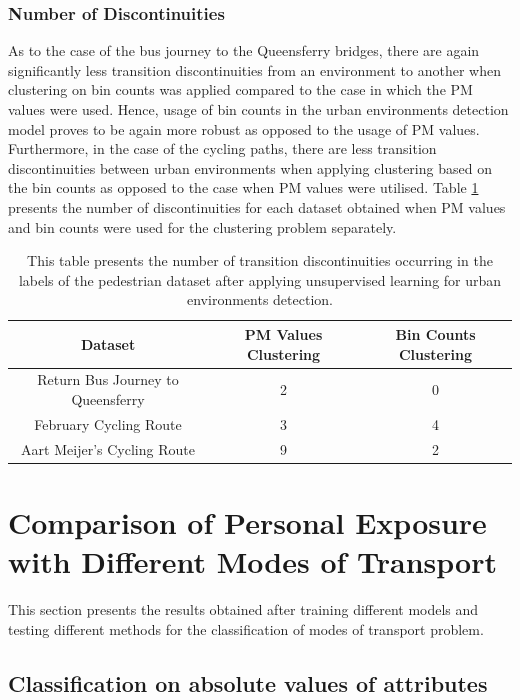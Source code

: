 \documentclass[bsc,frontabs,twoside,singlespacing, parskip,deptreport]{infthesis}     %
\begin{document}
\subsubsection*{Number of Discontinuities}

As to the case of the bus journey to the Queensferry bridges, there are again significantly less transition discontinuities from an environment to another when clustering on bin counts was applied compared to the case in which the PM values were used. Hence, usage of bin counts in the urban environments detection model proves to be again more robust as opposed to the usage of PM values. Furthermore, in the case of the cycling paths, there are less transition discontinuities between urban environments when applying clustering based on the bin counts as opposed to the case when PM values were utilised. Table \ref{table:discontinuities-bike-bus} presents the number of discontinuities for each dataset obtained when PM values and bin counts were used for the clustering problem separately.


\begin{table}[h!]
\centering
 \begin{tabular}{||c | c | c ||} 
 \hline
 Dataset & PM Values Clustering & Bin Counts Clustering \\ [0.5ex] 
 \hline\hline
 Return Bus Journey to Queensferry & 2 & 0 \\ 
 \hline
 February Cycling Route & 3 & 4 \\
 \hline
 Aart Meijer's Cycling Route & 9 & 2 \\
 \hline
\end{tabular}
\caption{This table presents the number of transition discontinuities occurring in the labels of the pedestrian dataset after applying unsupervised learning for urban environments detection.}
\label{table:discontinuities-bike-bus}
\end{table}


\section{Comparison of Personal Exposure with Different Modes of Transport}

This section presents the results obtained after training different models and testing different methods for the classification of modes of transport problem.

\subsection{Classification on absolute values of attributes}
\label{subsec:abs-values-models}
\end{document}
